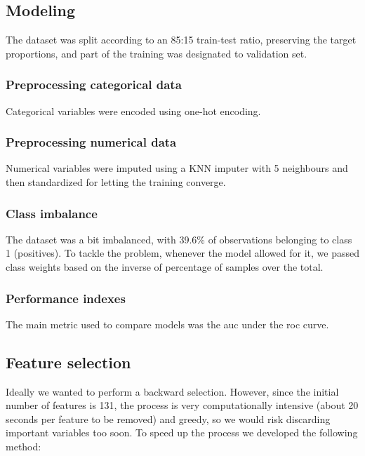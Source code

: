 \subsection{Modeling}

The dataset was split according to an 85:15 train-test ratio, preserving the target proportions, and part of the training was designated to validation set.


\subsubsection{Preprocessing categorical data}

Categorical variables were encoded using one-hot encoding.

\subsubsection{Preprocessing numerical data}

Numerical variables were imputed using a KNN imputer with 5 neighbours and then standardized for letting the training converge.

\subsubsection{Class imbalance}

The dataset was a bit imbalanced, with 39.6\% of observations belonging to class 1 (positives). To tackle the problem, whenever the model allowed for it, we passed class weights based on the inverse of percentage of samples over the total.

\subsubsection{Performance indexes}

The main metric used to compare models was the \gls{auc} under the \gls{roc} curve.

\subsection{Feature selection}

Ideally we wanted to perform a backward selection. However, since the initial number of features is 131, the process is very computationally intensive (about 20 seconds per feature to be removed) and greedy, so we would risk discarding important variables too soon. To speed up the process we developed the following method:

